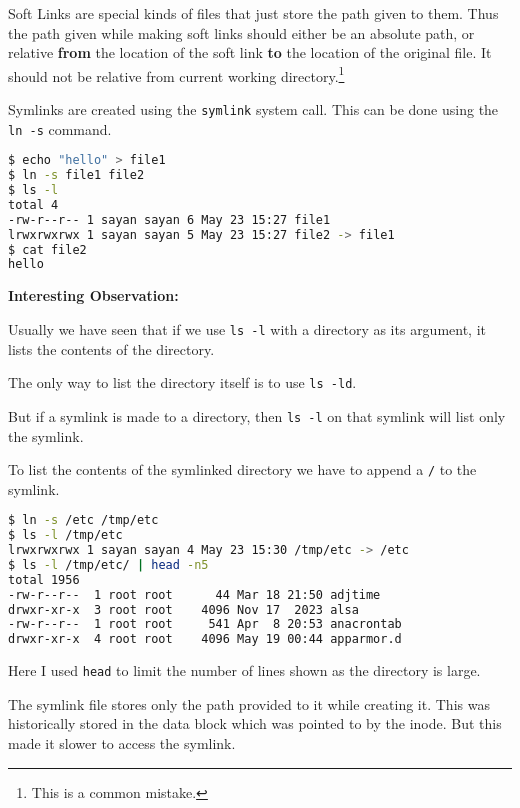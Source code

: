 \begin{definition}
  Soft Links are special kinds of files that just store the path
  given to them. Thus the path given while making soft links should
  either be an absolute path, or relative \textbf{from} the location of the
  soft link \textbf{to} the location of the original file. It should not be
  relative from current working directory.\footnote{This is a common mistake.}
\end{definition}

Symlinks are created using the \lstinline|symlink| system call.
This can be done using the \lstinline|ln -s| command.

\begin{lstlisting}[language=bash]
$ echo "hello" > file1
$ ln -s file1 file2
$ ls -l
total 4
-rw-r--r-- 1 sayan sayan 6 May 23 15:27 file1
lrwxrwxrwx 1 sayan sayan 5 May 23 15:27 file2 -> file1
$ cat file2
hello
\end{lstlisting}

\textbf{Interesting Observation:}

Usually we have seen that if we use \lstinline|ls -l| with a directory as its argument,
it lists the contents of the directory.

The only way to list the directory itself is to use \lstinline|ls -ld|.

But if a symlink is made to a directory, then \lstinline|ls -l| on that symlink will list only the symlink.

To list the contents of the symlinked directory we have to append a \lstinline|/| to the symlink.

\begin{lstlisting}[language=bash]
$ ln -s /etc /tmp/etc
$ ls -l /tmp/etc
lrwxrwxrwx 1 sayan sayan 4 May 23 15:30 /tmp/etc -> /etc
$ ls -l /tmp/etc/ | head -n5
total 1956
-rw-r--r--  1 root root      44 Mar 18 21:50 adjtime
drwxr-xr-x  3 root root    4096 Nov 17  2023 alsa
-rw-r--r--  1 root root     541 Apr  8 20:53 anacrontab
drwxr-xr-x  4 root root    4096 May 19 00:44 apparmor.d
\end{lstlisting}

Here I used \lstinline|head| to limit the number of lines shown as the directory is large.

The symlink file stores only the path provided to it while creating it.
This was historically stored in the data block which was pointed to by the inode.
But this made it slower to access the symlink.

